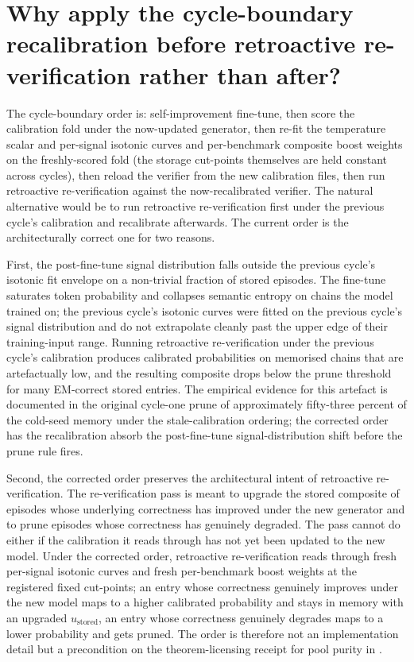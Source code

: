 
\section[Cycle-boundary ordering]{Why apply the cycle-boundary recalibration before retroactive re-verification rather than after?}
\label{app:qa-cycle-order}

The cycle-boundary order is: self-improvement fine-tune, then score the calibration fold under the now-updated generator, then re-fit the temperature scalar and per-signal isotonic curves and per-benchmark composite boost weights on the freshly-scored fold (the storage cut-points themselves are held constant across cycles), then reload the verifier from the new calibration files, then run retroactive re-verification against the now-recalibrated verifier. The natural alternative would be to run retroactive re-verification first under the previous cycle's calibration and recalibrate afterwards. The current order is the architecturally correct one for two reasons.

First, the post-fine-tune signal distribution falls outside the previous cycle's isotonic fit envelope on a non-trivial fraction of stored episodes. The fine-tune saturates token probability and collapses semantic entropy on chains the model trained on; the previous cycle's isotonic curves were fitted on the previous cycle's signal distribution and do not extrapolate cleanly past the upper edge of their training-input range. Running retroactive re-verification under the previous cycle's calibration produces calibrated probabilities on memorised chains that are artefactually low, and the resulting composite drops below the prune threshold for many EM-correct stored entries. The empirical evidence for this artefact is documented in the original cycle-one prune of approximately fifty-three percent of the cold-seed memory under the stale-calibration ordering; the corrected order has the recalibration absorb the post-fine-tune signal-distribution shift before the prune rule fires.

Second, the corrected order preserves the architectural intent of retroactive re-verification. The re-verification pass is meant to upgrade the stored composite of episodes whose underlying correctness has improved under the new generator and to prune episodes whose correctness has genuinely degraded. The pass cannot do either if the calibration it reads through has not yet been updated to the new model. Under the corrected order, retroactive re-verification reads through fresh per-signal isotonic curves and fresh per-benchmark boost weights at the registered fixed cut-points; an entry whose correctness genuinely improves under the new model maps to a higher calibrated probability and stays in memory with an upgraded $u_{\text{stored}}$, an entry whose correctness genuinely degrades maps to a lower probability and gets pruned. The order is therefore not an implementation detail but a precondition on the theorem-licensing receipt for pool purity in .


